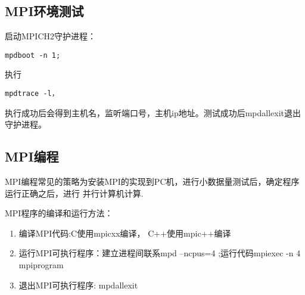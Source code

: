 \subsection{MPI环境测试}
    启动MPICH2守护进程：
    \begin{verbatim}
mpdboot -n 1;
    \end{verbatim}

    执行
    \begin{verbatim}
mpdtrace -l，
    \end{verbatim}

执行成功后会得到主机名，监听端口号，主机ip地址。测试成功后mpdallexit退出守护进程。

\subsection{MPI编程}
    MPI编程常见的策略为安装MPI的实现到PC机，进行小数据量测试后，确定程序运行正确之后，进行
并行计算机计算.

    MPI程序的编译和运行方法：
    \begin{enumerate}
    \item 编译MPI代码:C使用mpicxx编译， C++使用mpic++编译
    \item 运行MPI可执行程序：建立进程间联系mpd --ncpus=4 ;运行代码mpiexec -n 4 mpiprogram
    \item 退出MPI可执行程序: mpdallexit
    \end{enumerate}
